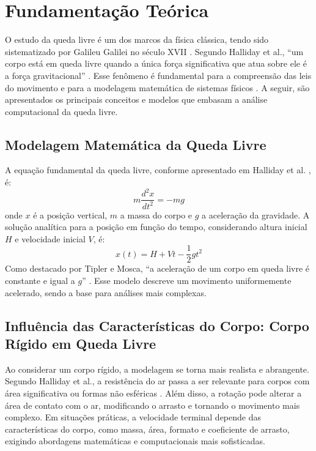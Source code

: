 

\chapter{Fundamentação Teórica}
\label{chap_fundamentacao_teorica}

O estudo da queda livre é um dos marcos da física clássica, tendo sido sistematizado por Galileu Galilei no século XVII \cite{galilei1638}. Segundo Halliday et al., “um corpo está em queda livre quando a única força significativa que atua sobre ele é a força gravitacional” \cite[p.~47]{halliday2011}. Esse fenômeno é fundamental para a compreensão das leis do movimento e para a modelagem matemática de sistemas físicos \cite{tipler2009}. A seguir, são apresentados os principais conceitos e modelos que embasam a análise computacional da queda livre.

\section{Modelagem Matemática da Queda Livre}

A equação fundamental da queda livre, conforme apresentado em Halliday et al. \cite{halliday2011}, é:
\begin{equation}
	m \frac{d^2x}{dt^2} = -mg
\end{equation}
onde $x$ é a posição vertical, $m$ a massa do corpo e $g$ a aceleração da gravidade. A solução analítica para a posição em função do tempo, considerando altura inicial $H$ e velocidade inicial $V$, é:
\begin{equation}
	x(t) = H + Vt - \frac{1}{2}gt^2
\end{equation}
Como destacado por Tipler e Mosca, “a aceleração de um corpo em queda livre é constante e igual a $g$” \cite[p.~34]{tipler2009}. Esse modelo descreve um movimento uniformemente acelerado, sendo a base para análises mais complexas.

\section{Influência das Características do Corpo: Corpo Rígido em Queda Livre}

Ao considerar um corpo rígido, a modelagem se torna mais realista e abrangente. Segundo Halliday et al., a resistência do ar passa a ser relevante para corpos com área significativa ou formas não esféricas \cite[p.~49]{halliday2011}. Além disso, a rotação pode alterar a área de contato com o ar, modificando o arrasto e tornando o movimento mais complexo. Em situações práticas, a velocidade terminal depende das características do corpo, como massa, área, formato e coeficiente de arrasto, exigindo abordagens matemáticas e computacionais mais sofisticadas.

